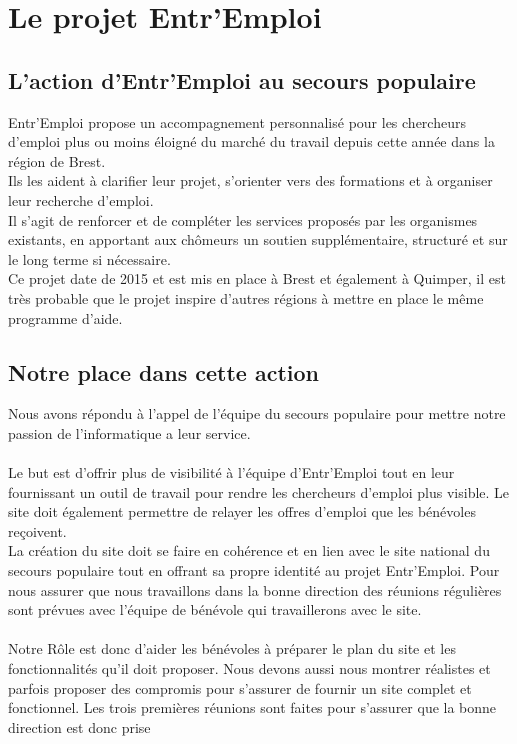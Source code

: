 \documentclass[a4paper, 12pt]{report}
\begin{document}
\chapter{Le projet Entr'Emploi}
\thispagestyle{fancy}
\section{L'action d'Entr'Emploi au secours populaire}
Entr'Emploi propose un accompagnement personnalisé pour les chercheurs d'emploi plus ou moins éloigné du marché du travail depuis cette année dans la région de Brest.\\
Ils les aident à clarifier leur projet, s'orienter vers des formations et à organiser leur recherche d'emploi.\\
Il s'agit de renforcer et de compléter les services proposés par les organismes existants, en apportant aux chômeurs un soutien supplémentaire, structuré et sur le long terme si nécessaire.\\
Ce projet date de 2015 et est mis en place à Brest et également à Quimper, il est très probable que le projet inspire d'autres régions à mettre en place le même programme d'aide.
\section{Notre place dans cette action}
Nous avons répondu à l'appel de l'équipe du secours populaire pour mettre notre passion de l'informatique a leur service.\\
\\
Le but est d'offrir plus de visibilité à l'équipe d'Entr'Emploi tout en leur fournissant un outil de travail pour rendre les chercheurs d'emploi plus visible. Le site doit également permettre de relayer les offres d'emploi que les bénévoles reçoivent.\\
La création du site doit se faire en cohérence et en lien avec le site national du secours populaire tout en offrant sa propre identité au projet Entr'Emploi. Pour nous assurer que nous travaillons dans la bonne direction des réunions régulières sont prévues avec l'équipe de bénévole qui travaillerons avec le site.\\
\\
Notre Rôle est donc d'aider les bénévoles à préparer le plan du site et les fonctionnalités qu'il doit proposer. Nous devons aussi nous montrer réalistes et parfois proposer des compromis pour s'assurer de fournir un site complet et fonctionnel. Les trois premières réunions sont faites pour s'assurer que la bonne direction est donc prise\\
\end{document}
